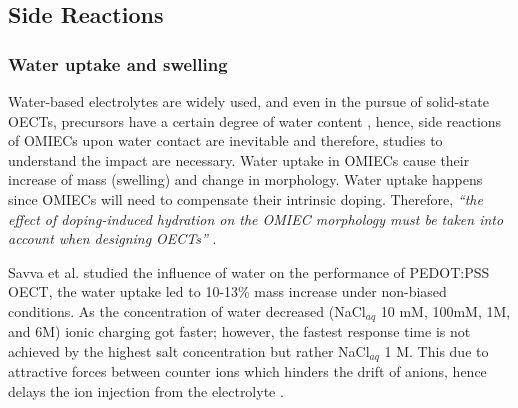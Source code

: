 \subsection{Side Reactions} \label{subsec:sidereac}



\subsubsection{Water uptake and swelling}

Water-based electrolytes are widely used, and even in the pursue of solid-state OECTs, precursors have a certain degree of water content \cite{weissbachPhotopatternableSolidElectrolyte2022}\cite{nguyen-dangBiomaterialBasedSolidElectrolyteOrganic2021}, hence, side reactions of OMIECs upon water contact are inevitable and therefore, studies to understand the impact are necessary.  %
Water uptake in OMIECs cause their increase of mass (swelling) and change in morphology. Water uptake happens since OMIECs will need to compensate their intrinsic doping. Therefore, \textit{``the effect of doping-induced hydration on the OMIEC morphology must be taken into account when designing OECTs''} \cite{savvaBalancingIonicElectronic2020}.

Savva et al. studied the influence of water on the performance of PEDOT:PSS OECT, the water uptake %
led to 10-13\% mass increase under non-biased conditions. As the concentration of water decreased (NaCl$_{aq}$ 10 mM, 100mM, 1M, and 6M) ionic charging got faster; %
however, the fastest %
response time is not achieved by the highest salt concentration but rather NaCl$_{aq}$ 1 M. This due to attractive forces between counter ions which %
hinders the drift of anions, hence delays the ion injection from the electrolyte %
\cite{savvaInfluenceWaterPerformance2019}.

